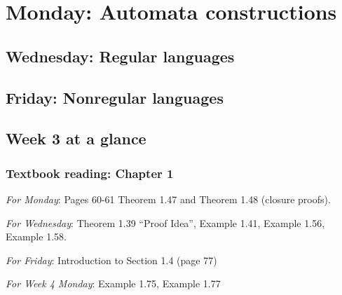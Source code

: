 

\section*{Monday: Automata constructions}


    
\newpage
\subsection*{Wednesday: Regular languages}




\newpage
\subsection*{Friday: Nonregular languages}



\newpage

\subsection*{Week 3 at a glance}

\subsubsection*{Textbook reading: Chapter 1}

{\it For Monday}: Pages 60-61 Theorem 1.47 and Theorem 1.48 (closure proofs).

{\it For Wednesday}: Theorem 1.39 ``Proof Idea'', Example 1.41, Example 1.56, Example 1.58.

{\it For Friday}: Introduction to Section 1.4 (page 77)

{\it For Week 4 Monday}: Example 1.75, Example 1.77


